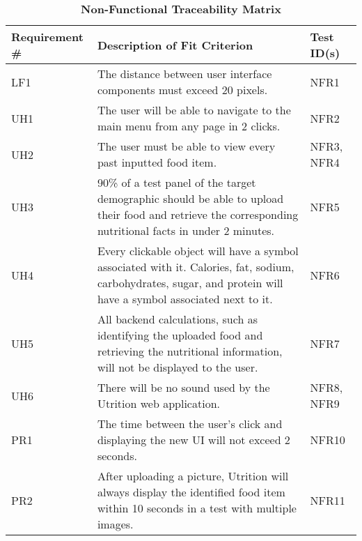 \documentclass[12pt, titlepage]{article}
\begin{document}
	\begin{table}[H]
		\caption{\bf Non-Functional Traceability Matrix}
		\begin{tabularx}{\linewidth}{|l|X|l|}
			\hline
			{\bf Requirement \#} & {\bf Description of Fit Criterion} & {\bf Test ID(s)}\\
			\hline
			LF1 & The distance between user interface components must exceed 20 pixels. & NFR1 \\
			\hline
			UH1 & The user will be able to navigate to the main menu from any page in 2 clicks. & NFR2 \\
			\hline
			UH2 & The user must be able to view every past inputted food item. & NFR3, NFR4 \\
			\hline
			UH3 & 90\% of a test panel of the target demographic should be able to upload their food and retrieve the corresponding nutritional facts in under 2 minutes. & NFR5 \\
			\hline
			UH4 & Every clickable object will have a symbol associated with it. Calories, fat, sodium, carbohydrates, sugar, and protein will have a symbol associated next to it.
			& NFR6 \\
			\hline
			UH5 & All backend calculations, such as identifying the uploaded food and retrieving the nutritional information, will not be displayed to the user. & NFR7 \\
			\hline
			UH6 & There will be no sound used by the Utrition web application.  & NFR8, NFR9 \\
			\hline
			PR1 & The time between the user’s click and displaying the new UI will not exceed 2 seconds. & NFR10 \\
			\hline
			PR2 & After uploading a picture, Utrition will always display the 
			identified food item within 10 seconds in a test with multiple 
			images. & NFR11 \\
			\hline
		\end{tabularx}
		\label{tab:Non-Functional Traceability}
	\end{table}
\end{document}
